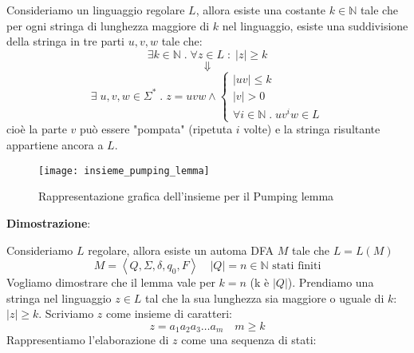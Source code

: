 \documentclass[a4paper]{article}
\begin{document}
\begin{theorem}
  Consideriamo un linguaggio regolare \( L \), allora esiste una costante
  \( k \in \mathbb{N} \) tale che per ogni stringa di lunghezza maggiore di \( k \) nel
  linguaggio, esiste una suddivisione della stringa in tre parti \( u,v,w \) tale che:
  \[
    \exists k \in \mathbb{N} \;.\; \forall z \in L \;:\; |z| \ge k
  \] 
  \[
    \Downarrow
  \] 
  \[
    \exists\;
    u,v,w \in \Sigma^* \;.\;
    z = uvw \wedge \begin{cases}
      |uv| \le k\\
      |v| > 0\\
      \forall i \in \mathbb{N} \;.\; uv^iw \in L
    \end{cases}
  \] 
  cioè la parte \( v \) può essere "pompata" (ripetuta \( i \) volte) e la stringa
  risultante appartiene ancora a \( L \).
  \begin{figure}[H]
    \centering
    \texttt{[image: insieme\_pumping\_lemma]}
    \caption{Rappresentazione grafica dell'insieme per il Pumping lemma}
  \end{figure}

  \vspace{1em}
  \noindent
  \textbf{Dimostrazione}:

  \noindent
  Consideriamo \( L \) regolare, allora esiste un automa DFA \( M \) tale che \( L = L(M) \) 
  \[
    M = \left< Q, \Sigma, \delta, q_0, F \right> \quad |Q| = n \in \mathbb{N} \text{ stati finiti}
  \] 
  Vogliamo dimostrare che il lemma vale per \( k = n \) (k è \( |Q| \)). Prendiamo
  una stringa nel linguaggio \( z \in L \) tal che la sua lunghezza sia maggiore o
  uguale di \( k \): \( |z| \ge k \). Scriviamo \( z \) come insieme di caratteri:
  \[
    z = a_1 a_2 a_3 \ldots a_{m} \quad m \ge k
  \] 
  Rappresentiamo l'elaborazione di \( z \) come una sequenza di stati:
  \begin{figure}[H]
    \centering
\end{figure}
\end{theorem}
\end{document}
